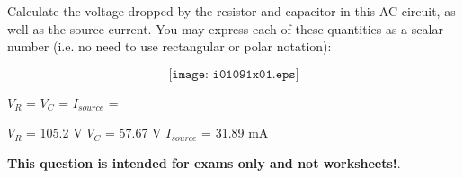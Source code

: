 

Calculate the voltage dropped by the resistor and capacitor in this AC circuit, as well as the source current.  You may express each of these quantities as a scalar number (i.e. no need to use rectangular or polar notation):

$$\texttt{[image: i01091x01.eps]}$$

$V_R$ = \hskip 100pt $V_C$ = \hskip 100pt $I_{source}$ = 

\vskip 10pt







$V_R$ = 105.2 V \hskip 100pt $V_C$ = 57.67 V \hskip 100pt $I_{source}$ = 31.89 mA







{\bf This question is intended for exams only and not worksheets!}.



